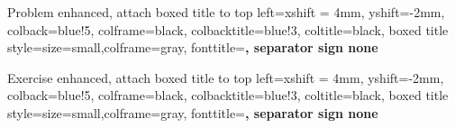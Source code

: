 \usepackage[10pt]{extsizes}
\usepackage{amsfonts}
\usepackage{amssymb}
\usepackage[shortlabels]{enumitem}
\usepackage{microtype} 
\usepackage{amsmath}
\usepackage{mathtools}
\usepackage{commath}
\usepackage{amsthm}
\usepackage{bbm}

\usepackage{tcolorbox}
              {Problem}%
  {enhanced, %
  attach boxed title to top left={xshift = 4mm, yshift=-2mm},
  colback=blue!5, colframe=black, colbacktitle=blue!3, coltitle=black,
  boxed title style={size=small,colframe=gray},
  fonttitle=\bfseries,
  separator sign none
  }%
  {} 
\newenvironment{problem}[1]{\begin{prob*}{#1}{}}{\end{prob*}}

              {Exercise}%
  {enhanced, %
  attach boxed title to top left={xshift = 4mm, yshift=-2mm},
  colback=blue!5, colframe=black, colbacktitle=blue!3, coltitle=black,
  boxed title style={size=small,colframe=gray},
  fonttitle=\bfseries,
  separator sign none
  }%
  {} 
\newenvironment{exercise}[1]{\begin{exer*}{#1}{}}{\end{exer*}}

\newtheorem{thm}{Theorem}
\newtheorem*{thm-non}{Theorem}
\newtheorem{lemma}[thm]{Lemma}
\newtheorem{definition}[thm]{Definition}
\newtheorem{remark}[thm]{Remark}
\newtheorem{corollary}[thm]{Corollary}
\newtheorem{proposition}[thm]{Proposition}

\theoremstyle{remark}
\newtheorem*{example}{Example}

\renewcommand\thesection{\Alph{section}:}

